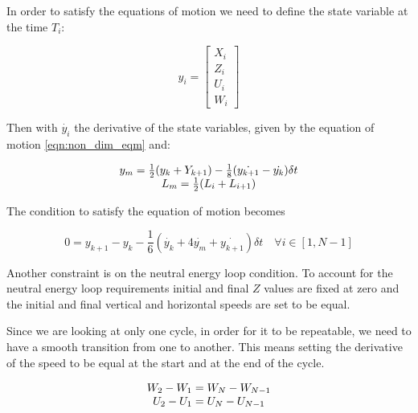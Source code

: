 In order to satisfy the equations of motion we need to define the state variable at the time $T_i$:

\begin{equation}
  y_i= \begin{bmatrix}
    X_i \\
    Z_i \\
    U_i \\
    W_i 
  \end{bmatrix}
  \label{eqn:state_i}
\end{equation}

Then with $\dot{y_i}$ the derivative of the state variables, given by the equation of motion \ref{eqn:non_dim_eqm} and:

\begin{equation}
  \begin{array}[c]{c}
    y_m= \frac{1}{2}(y_k + Y_{k+1}) - \frac{1}{8}(\dot{y_{k+1}} - \dot{y_k})\delta t \\
    L_m=\frac{1}{2}(L_i + L_{i+1})
  \end{array}
  \label{eqn:simpson_middle}
\end{equation}

The condition to satisfy the equation of motion becomes

\begin{equation}
  0=y_{k+1} - y_k - \frac{1}{6}( \dot{y_k} + 4 \dot{y_m} + \dot{y_{k+1}})\delta t \quad \forall i \in [1,N-1]
  \label{eqn:simpson}
\end{equation}

\par Another constraint is on the neutral energy loop condition.
To account for the neutral energy loop requirements initial and final $Z$ values are fixed at zero and the initial and final vertical and horizontal speeds are set to be equal.

\par Since we are looking at only one cycle, in order for it to be repeatable, we need to have a smooth transition from one to another.
This means setting the derivative of the speed to be equal at the start and at the end of the cycle.

\begin{equation}
  \begin{array}[c]{c}
    W_2 - W_1 = W_N - W_{N-1} \\
    U_2 - U_1 = U_N - U_{N-1} 
  \end{array}
  \label{eqn:derivative_constraint}
\end{equation}

